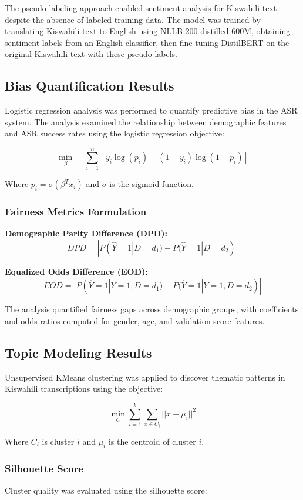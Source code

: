 \documentclass[12pt,a4paper]{report}
\begin{document}
The pseudo-labeling approach enabled sentiment analysis for Kiswahili text despite the absence of labeled training data. The model was trained by translating Kiswahili text to English using NLLB-200-distilled-600M, obtaining sentiment labels from an English classifier, then fine-tuning DistilBERT on the original Kiswahili text with these pseudo-labels.

\subsection{Bias Quantification Results}
Logistic regression analysis was performed to quantify predictive bias in the ASR system. The analysis examined the relationship between demographic features and ASR success rates using the logistic regression objective:

$$\min_{\beta} -\sum_{i=1}^{n} \left[ y_i \log(p_i) + (1-y_i)\log(1-p_i) \right]$$

Where $p_i = \sigma(\beta^T x_i)$ and $\sigma$ is the sigmoid function.

\subsubsection{Fairness Metrics Formulation}

\textbf{Demographic Parity Difference (DPD):}
$$DPD = |P(\hat{Y}=1|D=d_1) - P(\hat{Y}=1|D=d_2)|$$

\textbf{Equalized Odds Difference (EOD):}
$$EOD = |P(\hat{Y}=1|Y=1,D=d_1) - P(\hat{Y}=1|Y=1,D=d_2)|$$

The analysis quantified fairness gaps across demographic groups, with coefficients and odds ratios computed for gender, age, and validation score features.

\subsection{Topic Modeling Results}
Unsupervised KMeans clustering was applied to discover thematic patterns in Kiswahili transcriptions using the objective:

$$\min_{C} \sum_{i=1}^{k} \sum_{x \in C_i} ||x - \mu_i||^2$$

Where $C_i$ is cluster $i$ and $\mu_i$ is the centroid of cluster $i$.

\subsubsection{Silhouette Score}
Cluster quality was evaluated using the silhouette score:
\end{document}
